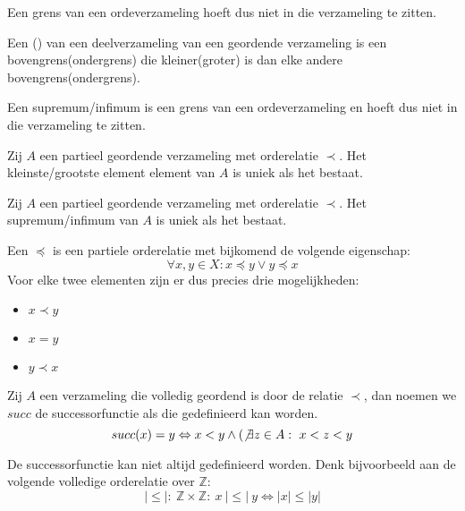 \documentclass[main.tex]{subfiles}
\begin{document}
\begin{opm}
  Een grens van een ordeverzameling hoeft dus niet in die verzameling te zitten.
\end{opm}

\begin{de}
  Een () van een deelverzameling van een geordende verzameling is een bovengrens(ondergrens) die kleiner(groter) is dan elke andere bovengrens(ondergrens).
\end{de}

\begin{opm}
  Een supremum/infimum is een grens van een ordeverzameling en hoeft dus niet in die verzameling te zitten.
\end{opm}

\begin{st}
  Zij $A$ een partieel geordende verzameling met orderelatie $\prec$.
  Het kleinste/grootste element element van $A$ is uniek als het bestaat.
\end{st}

\begin{st}
  Zij $A$ een partieel geordende verzameling met orderelatie $\prec$.
  Het supremum/infimum van $A$ is uniek als het bestaat.
\end{st}

\begin{de}
  Een  $\preceq$ is een partiele orderelatie met bijkomend de volgende eigenschap:
  \[ \forall x,y \in X: x \preceq y \vee y \preceq x \]
  Voor elke twee elementen zijn er dus precies drie mogelijkheden:
  \begin{itemize}
  \item $x \prec y$
  \item $x = y$
  \item $y \prec x$
  \end{itemize}
\end{de}

\begin{de}
  Zij $A$ een verzameling die volledig geordend is door de relatie $\prec$, dan noemen we $succ$ de successorfunctie als die gedefinieerd kan worden.
  \[ succ(x) = y \Leftrightarrow x < y \wedge (\not\exists z \in A:\ x < z < y \]
\end{de}

\begin{opm}
  De successorfunctie kan niet altijd gedefinieerd worden.
  Denk bijvoorbeeld aan de volgende volledige orderelatie over $\mathbb{Z}$:
  \[ |\le|:\ \mathbb{Z} \times \mathbb{Z}:\ x\ |\le|\ y \Leftrightarrow |x| \le |y| \]
\end{opm}
\end{document}
